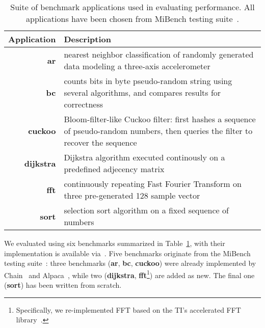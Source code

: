 \begin{table}
	\centering
	\footnotesize
	\begin{tabular}{| r | p{} |}
		\hline
		Application & Description \\
		\hline\hline
		\textbf{ar} & nearest neighbor classification of randomly generated data modeling a three-axis accelerometer\\
		\hline
		\textbf{bc} & counts bits in byte pseudo-random string using several algorithms, and compares results for correctness\\
		\hline
		\textbf{cuckoo} & Bloom-filter-like Cuckoo filter: first hashes a sequence of pseudo-random numbers, then queries the filter to recover the sequence\\
		\hline
		\textbf{dijkstra} &  Dijkstra algorithm executed continously on a predefined adjecency matrix\\
		\hline
		\textbf{fft} & continuously repeating Fast Fourier Transform on three pre-generated 128 sample vector\\
		\hline
		\textbf{sort} & selection sort algorithm on a fixed sequence of numbers\\
		\hline
	\end{tabular}
\caption{Suite of benchmark applications used in evaluating \sys performance. All applications have been chosen from MiBench testing suite~\cite{mibench,hicks_mibench2_2016}.}
\label{table:benchmark_table}
\end{table}

We evaluated \sys using six benchmarks summarized in Table~\ref{table:benchmark_table}, with their implementation is available via~\cite{coala_website}. Five benchmarks originate from the MiBench testing suite~\cite{mibench,hicks_mibench2_2016}: three benchmarks (\textbf{ar}, \textbf{bc}, \textbf{cuckoo}) were already implemented by Chain~\cite{chain} and Alpaca~\cite{alpaca}, while two (\textbf{dijkstra}, \textbf{fft}\footnote{Specifically, we re-implemented FFT based on the TI's accelerated FFT library~\cite{}.}) are added as new. The final one (\textbf{sort}) has been written from scratch. 


